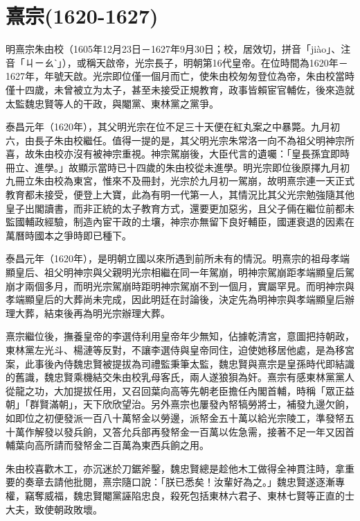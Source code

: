 
\section{熹宗\tiny(1620-1627)}

明熹宗朱由校（1605年12月23日－1627年9月30日；校，居效切，拼音「jiào」、注音「ㄐㄧㄠˋ」），或稱天啟帝，光宗長子，明朝第16代皇帝。在位時間為1620年－1627年，年號天啟。光宗即位僅一個月而亡，使朱由校匆匆登位為帝，朱由校當時僅十四歲，未曾被立为太子，甚至未接受正規教育，政事皆賴宦官輔佐，後來造就太監魏忠賢等人的干政，與閹黨、東林黨之黨爭。

泰昌元年（1620年），其父明光宗在位不足三十天便在紅丸案之中暴斃。九月初六，由長子朱由校繼任。值得一提的是，其父明光宗朱常洛一向不為祖父明神宗所喜，故朱由校亦沒有被神宗重視。神宗駕崩後，大臣代言的遺囑：「皇長孫宜即時冊立、進學。」故顯示當時已十四歲的朱由校從未進學。明光宗即位後原擇九月初九冊立朱由校為東宮，惟來不及冊封，光宗於九月初一駕崩，故明熹宗連一天正式教育都未接受，便登上大寶，此為有明一代第一人，其情況比其父光宗勉強隨其他皇子出閣讀書，而非正統的太子教育方式，還要更加惡劣，且父子倆在繼位前都未監國輔政經驗，制造內宦干政的土壤，神宗亦無留下良好輔臣，國運衰退的因素在萬曆時國本之爭時即已種下。

泰昌元年（1620年），是明朝立國以來所遇到前所未有的情況。明熹宗的祖母孝端顯皇后、祖父明神宗與父親明光宗相繼在同一年駕崩，明神宗駕崩距孝端顯皇后駕崩才兩個多月，而明光宗駕崩時距明神宗駕崩不到一個月，實屬罕見。而明神宗與孝端顯皇后的大葬尚未完成，因此明廷在討論後，決定先為明神宗與孝端顯皇后辦理大葬，結束後再為明光宗辦理大葬。

熹宗繼位後，撫養皇帝的李選侍利用皇帝年少無知，佔據乾清宮，意圖把持朝政，東林黨左光斗、楊漣等反對，不讓李選侍與皇帝同住，迫使她移居他處，是為移宮案，此事後內侍魏忠賢被提拔為司禮監秉筆太監，魏忠賢與熹宗是皇孫時代即結識的舊識，魏忠賢乘機結交朱由校乳母客氏，兩人遂狼狽為奸。熹宗有感東林黨黨人從龍之功，大加提拔任用，又召回葉向高等先朝老臣擔任內閣首輔，時稱「眾正益朝」「群賢滿朝」，天下欣欣望治。另外熹宗也屢發內帑犒勞將士，補發九邊欠餉，如即位之初便發派一百八十萬帑金以勞邊，派帑金五十萬以給光宗陵工，準發帑五十萬作解發以發兵餉，又答允兵部再發帑金一百萬以佐急需，接著不足一年又因首輔葉向高所請而發帑金二百萬為東西兵餉之用。

朱由校喜歡木工，亦沉迷於刀鋸斧鑿，魏忠賢總是趁他木工做得全神貫注時，拿重要的奏章去請他批閱，熹宗隨口說：「朕已悉矣！汝輩好為之。」魏忠賢遂逐漸專權，竊奪威福，魏忠賢閹黨誣陷忠良，殺死包括東林六君子、東林七賢等正直的士大夫，致使朝政敗壞。


